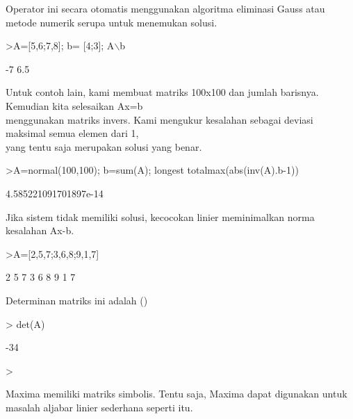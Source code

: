 \documentclass[a4paper,10pt]{article}
\begin{document}
\begin{eulernotebook}
\begin{eulercomment}
\begin{eulercomment}
\begin{eulercomment}
\begin{eulercomment}
\begin{eulercomment}
Operator ini secara otomatis menggunakan algoritma eliminasi Gauss
atau metode numerik serupa untuk menemukan solusi.
\end{eulercomment}
\begin{eulerprompt}
>A=[5,6;7,8]; b= [4;3]; A\(\backslash\)b
\end{eulerprompt}
\begin{euleroutput}
             -7 
            6.5 
\end{euleroutput}
\begin{eulercomment}
Untuk contoh lain, kami membuat matriks 100x100 dan jumlah barisnya.
Kemudian kita selesaikan Ax=b\\
menggunakan matriks invers. Kami mengukur kesalahan sebagai deviasi
maksimal semua elemen dari 1,\\
yang tentu saja merupakan solusi yang benar.
\end{eulercomment}
\begin{eulerprompt}
>A=normal(100,100); b=sum(A); longest totalmax(abs(inv(A).b-1))
\end{eulerprompt}
\begin{euleroutput}
    4.585221091701897e-14 
\end{euleroutput}
\begin{eulercomment}
Jika sistem tidak memiliki solusi, kecocokan linier meminimalkan norma\\
kesalahan Ax-b.
\end{eulercomment}
\begin{eulerprompt}
>A=[2,5,7;3,6,8;9,1,7]
\end{eulerprompt}
\begin{euleroutput}
              2             5             7 
              3             6             8 
              9             1             7 
\end{euleroutput}
\begin{eulercomment}
Determinan matriks ini adalah ()
\end{eulercomment}
\begin{eulerprompt}
> det(A)
\end{eulerprompt}
\begin{euleroutput}
  -34
\end{euleroutput}
\begin{eulerprompt}
> 
\end{eulerprompt}
\begin{eulercomment}
Maxima memiliki matriks simbolis. Tentu saja, Maxima dapat digunakan
untuk masalah aljabar linier sederhana seperti itu.\\

\end{eulercomment}
\end{eulercomment}
\end{eulercomment}
\end{eulercomment}
\end{eulercomment}
\end{eulernotebook}
\end{document}
